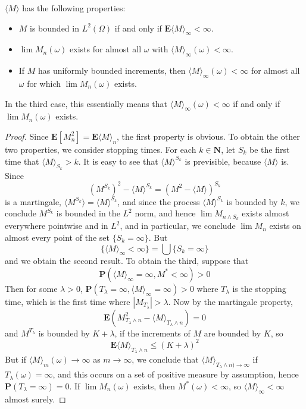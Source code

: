 \begin{theorem}
    $\langle M \rangle$ has the following properties:
    \begin{itemize}
        \item $M$ is bounded in $L^2(\Omega)$ if and only if $\mathbf{E} \langle M \rangle_\infty < \infty$.

        \item $\lim M_n(\omega)$ exists for almost all $\omega$ with $\langle M \rangle_\infty(\omega) < \infty$.

        \item If $M$ has uniformly bounded increments, then $\langle M \rangle_\infty(\omega) < \infty$ for almost all $\omega$ for which $\lim M_n(\omega)$ exists.
    \end{itemize}
    In the third case, this essentially means that $\langle M \rangle_\infty(\omega) < \infty$ if and only if $\lim M_n(\omega)$ exists.
\end{theorem}
\begin{proof}
    Since $\mathbf{E}[M_n^2] = \mathbf{E}\langle M \rangle_n$, the first property is obvious. To obtain the other two properties, we consider stopping times. For each $k \in \mathbf{N}$, let $S_k$ be the first time that $\langle M \rangle_{S_k} > k$. It is easy to see that $\langle M \rangle^{S_k}$ is previsible, because $\langle M \rangle$ is. Since
    \[ (M^{S_k})^2 - \langle M \rangle^{S_k} = (M^2 - \langle M \rangle)^{S_k} \]
    is a martingale, $\langle M^{S_k} \rangle = \langle M \rangle^{S_k}$, and since the process $\langle M \rangle^{S_k}$ is bounded by $k$, we conclude $M^{S_k}$ is bounded in the $L^2$ norm, and hence $\lim M_{n \wedge S_k}$ exists almost everywhere pointwise and in $L^2$, and in particular, we conclude $\lim M_n$ exists on almost every point of the set $\{ S_k = \infty \}$. But
    \[ \{ \langle M \rangle_\infty < \infty \} = \bigcup \{ S_k = \infty \} \]
    and we obtain the second result. To obtain the third, suppose that
    \[ \mathbf{P}(\langle M \rangle_\infty = \infty, M^* < \infty) > 0 \]
    Then for some $\lambda > 0$, $\mathbf{P}(T_\lambda = \infty, \langle M \rangle_\infty = \infty) > 0$ where $T_\lambda$ is the stopping time, which is the first time where $|M_{T_\lambda}| > \lambda$. Now by the martingale property,
    \[ \mathbf{E}(M_{T_\lambda \wedge n}^2 - \langle M \rangle_{T_\lambda \wedge n}) = 0 \]
    and $M^{T_\lambda}$ is bounded by $K + \lambda$, if the increments of $M$ are bounded by $K$, so
    \[ \mathbf{E} \langle M \rangle_{T_\lambda \wedge n} \leq (K + \lambda)^2 \]
    But if $\langle M \rangle_m(\omega) \to \infty$ as $m \to \infty$, we conclude that $\langle M \rangle_{T_\lambda \wedge n) \to \infty}$ if $T_\lambda(\omega) = \infty$, and this occurs on a set of positive measure by assumption, hence $\mathbf{P}(T_\lambda = \infty) = 0$. If $\lim M_n(\omega)$ exists, then $M^*(\omega) < \infty$, so $\langle M \rangle_\infty < \infty$ almost surely.
\end{proof}

